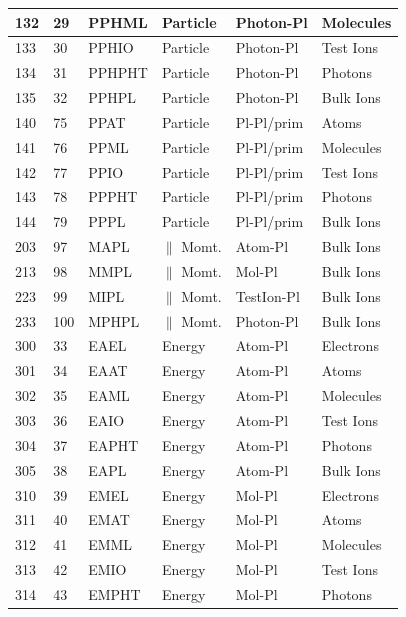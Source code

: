 \documentclass{article}
\begin{document}
\begin{longtable}{|l|l|l|l|l|l|}
132  & 29       & PPHML  & Particle & Photon-Pl  & Molecules  \\ \hline
133  & 30       & PPHIO  & Particle & Photon-Pl  & Test Ions  \\ \hline
134  & 31       & PPHPHT & Particle & Photon-Pl  & Photons    \\ \hline
135  & 32       & PPHPL  & Particle & Photon-Pl  & Bulk Ions  \\ \hline
140  & 75       & PPAT   & Particle & Pl-Pl/prim & Atoms      \\ \hline
141  & 76       & PPML   & Particle & Pl-Pl/prim & Molecules  \\ \hline
142  & 77       & PPIO   & Particle & Pl-Pl/prim & Test Ions  \\ \hline
143  & 78       & PPPHT  & Particle & Pl-Pl/prim & Photons    \\ \hline
144  & 79       & PPPL   & Particle & Pl-Pl/prim & Bulk Ions  \\ \hline
203  & 97       & MAPL   & $\|$ Momt. & Atom-Pl    & Bulk Ions  \\ \hline
213  & 98       & MMPL   & $\|$ Momt. & Mol-Pl     & Bulk Ions  \\ \hline
223  & 99       & MIPL   & $\|$ Momt. & TestIon-Pl & Bulk Ions  \\ \hline
233  & 100      & MPHPL  & $\|$ Momt. & Photon-Pl  & Bulk Ions  \\ \hline
300  & 33       & EAEL   & Energy   & Atom-Pl    & Electrons  \\ \hline
301  & 34       & EAAT   & Energy   & Atom-Pl    & Atoms      \\ \hline
302  & 35       & EAML   & Energy   & Atom-Pl    & Molecules  \\ \hline
303  & 36       & EAIO   & Energy   & Atom-Pl    & Test Ions  \\ \hline
304  & 37       & EAPHT  & Energy   & Atom-Pl    & Photons    \\ \hline
305  & 38       & EAPL   & Energy   & Atom-Pl    & Bulk Ions  \\ \hline
310  & 39       & EMEL   & Energy   & Mol-Pl     & Electrons  \\ \hline
311  & 40       & EMAT   & Energy   & Mol-Pl     & Atoms      \\ \hline
312  & 41       & EMML   & Energy   & Mol-Pl     & Molecules  \\ \hline
313  & 42       & EMIO   & Energy   & Mol-Pl     & Test Ions  \\ \hline
314  & 43       & EMPHT  & Energy   & Mol-Pl     & Photons    \\ \hline

\end{longtable}
\end{document}
